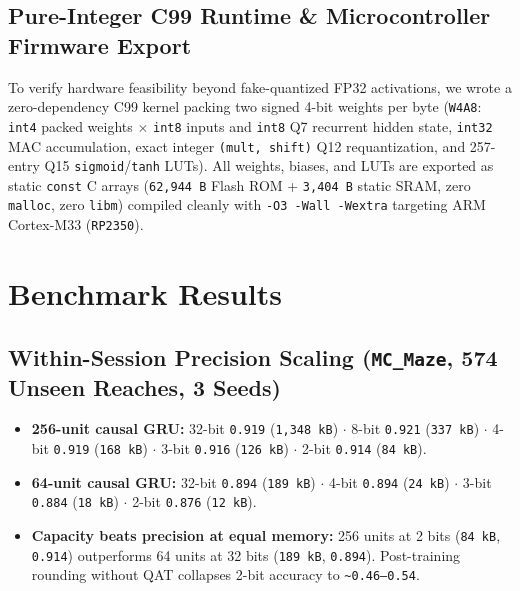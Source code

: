 \documentclass[11pt,a4paper]{article}
\begin{document}
\subsection{Pure-Integer C99 Runtime \& Microcontroller Firmware Export}
To verify hardware feasibility beyond fake-quantized FP32 activations, we wrote a zero-dependency C99 kernel packing two signed 4-bit weights per byte (\texttt{W4A8}: \texttt{int4} packed weights $\times$ \texttt{int8} inputs and \texttt{int8} Q7 recurrent hidden state, \texttt{int32} MAC accumulation, exact integer \texttt{(mult, shift)} Q12 requantization, and 257-entry Q15 \texttt{sigmoid}/\texttt{tanh} LUTs). All weights, biases, and LUTs are exported as static \texttt{const} C arrays (\texttt{62,944 B} Flash ROM + \texttt{3,404 B} static SRAM, zero \texttt{malloc}, zero \texttt{libm}) compiled cleanly with \texttt{-O3 -Wall -Wextra} targeting ARM Cortex-M33 (\texttt{RP2350}).

\section{Benchmark Results}
\subsection{Within-Session Precision Scaling (\texttt{MC\_Maze}, 574 Unseen Reaches, 3 Seeds)}
\begin{itemize}
\item \textbf{256-unit causal GRU:} 32-bit \texttt{0.919} (\texttt{1,348 kB}) $\cdot$ 8-bit \texttt{0.921} (\texttt{337 kB}) $\cdot$ 4-bit \texttt{0.919} (\texttt{168 kB}) $\cdot$ 3-bit \texttt{0.916} (\texttt{126 kB}) $\cdot$ 2-bit \texttt{0.914} (\texttt{84 kB}).
\item \textbf{64-unit causal GRU:} 32-bit \texttt{0.894} (\texttt{189 kB}) $\cdot$ 4-bit \texttt{0.894} (\texttt{24 kB}) $\cdot$ 3-bit \texttt{0.884} (\texttt{18 kB}) $\cdot$ 2-bit \texttt{0.876} (\texttt{12 kB}).
\item \textbf{Capacity beats precision at equal memory:} 256 units at 2 bits (\texttt{84 kB}, \texttt{0.914}) outperforms 64 units at 32 bits (\texttt{189 kB}, \texttt{0.894}). Post-training rounding without QAT collapses 2-bit accuracy to \texttt{\textasciitilde{}0.46--0.54}.
\end{itemize}
\end{document}
